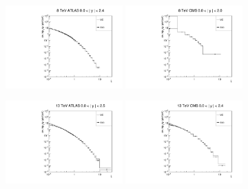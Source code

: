 \documentclass{article}
\begin{document}
\begin{figure}[h!]
\centering
\includegraphics[width = 0.4\textwidth]{xi_8_A_y0.pdf}
\includegraphics[width = 0.4\textwidth]{xi_8_C_y0.pdf}

\includegraphics[width = 0.4\textwidth]{xi_13_A_y0.pdf}
\includegraphics[width = 0.4\textwidth]{xi_13_C_y0.pdf}
\end{figure}

\clearpage
\end{document}
